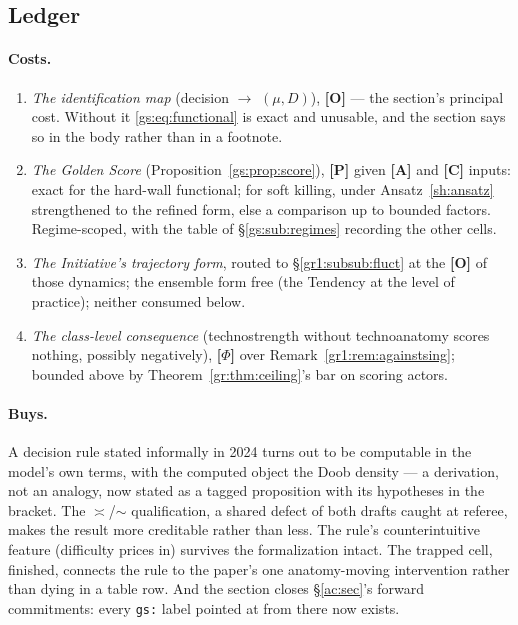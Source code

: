 \documentclass[11pt]{article}
\numberwithin{equation}{section}
\theoremstyle{plain}
\theoremstyle{definition}
\theoremstyle{remark}
\begin{document}
\subsection{Ledger}\label{gs:sub:ledger}

\paragraph{Costs.}
\begin{enumerate}
    \item \emph{The identification map} (decision $\to$ $(\mu, D)$), \textbf{[O]} --- the section's principal cost. Without it \eqref{gs:eq:functional} is exact and unusable, and the section says so in the body rather than in a footnote.
    \item \emph{The Golden Score} (Proposition~\ref{gs:prop:score}), \textbf{[P]} given \textbf{[A]} and \textbf{[C]} inputs: exact for the hard-wall functional; for soft killing, under Ansatz~\ref{sh:ansatz} strengthened to the refined form, else a comparison up to bounded factors. Regime-scoped, with the table of \S\ref{gs:sub:regimes} recording the other cells.
    \item \emph{The Initiative's trajectory form}, routed to \S\ref{gr1:subsub:fluct} at the \textbf{[O]} of those dynamics; the ensemble form free (the Tendency at the level of practice); neither consumed below.
    \item \emph{The class-level consequence} (technostrength without technoanatomy scores nothing, possibly negatively), \textbf{[$\Phi$]} over Remark~\ref{gr1:rem:againstsing}; bounded above by Theorem~\ref{gr:thm:ceiling}'s bar on scoring actors.
\end{enumerate}

\paragraph{Buys.} A decision rule stated informally in 2024 turns out to be computable in the model's own terms, with the computed object the Doob density --- a derivation, not an analogy, now stated as a tagged proposition with its hypotheses in the bracket. The $\asymp$/$\sim$ qualification, a shared defect of both drafts caught at referee, makes the result more creditable rather than less. The rule's counterintuitive feature (difficulty prices in) survives the formalization intact. The trapped cell, finished, connects the rule to the paper's one anatomy-moving intervention rather than dying in a table row. And the section closes \S\ref{ac:sec}'s forward commitments: every \texttt{gs:} label pointed at from there now exists.
\end{document}
